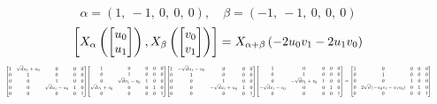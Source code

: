 \documentclass[11pt]{article}
\theoremstyle{definition}
\begin{document}
\[
\alpha = \left( 1, \  -1, \  0, \  0, \  0\right), \quad \beta = \left( -1, \  -1, \  0, \  0, \  0\right)
\]
\[
\scaletoalign{\textwidth}{\left[ X_{\alpha}\left(\left[\begin{matrix}u_{0}\\u_{1}\end{matrix}\right]\right), X_{\beta}\left(\left[\begin{matrix}v_{0}\\v_{1}\end{matrix}\right]\right) \right] = X_{\alpha + \beta}\left(- 2 u_{0} v_{1} - 2 u_{1} v_{0}\right)}
\]
\[
\scaletoalign{\textwidth}{{\left[\begin{matrix}1 & \sqrt{d} u_{1} + u_{0} & 0 & 0 & 0\\0 & 1 & 0 & 0 & 0\\0 & 0 & 1 & 0 & 0\\0 & 0 & \sqrt{d} u_{1} - u_{0} & 1 & 0\\0 & 0 & 0 & 0 & 1\end{matrix}\right]} {\left[\begin{matrix}1 & 0 & 0 & 0 & 0\\0 & 1 & 0 & 0 & 0\\0 & \sqrt{d} v_{1} - v_{0} & 1 & 0 & 0\\\sqrt{d} v_{1} + v_{0} & 0 & 0 & 1 & 0\\0 & 0 & 0 & 0 & 1\end{matrix}\right]} {\left[\begin{matrix}1 & - \sqrt{d} u_{1} - u_{0} & 0 & 0 & 0\\0 & 1 & 0 & 0 & 0\\0 & 0 & 1 & 0 & 0\\0 & 0 & - \sqrt{d} u_{1} + u_{0} & 1 & 0\\0 & 0 & 0 & 0 & 1\end{matrix}\right]} {\left[\begin{matrix}1 & 0 & 0 & 0 & 0\\0 & 1 & 0 & 0 & 0\\0 & - \sqrt{d} v_{1} + v_{0} & 1 & 0 & 0\\- \sqrt{d} v_{1} - v_{0} & 0 & 0 & 1 & 0\\0 & 0 & 0 & 0 & 1\end{matrix}\right]} = {\left[\begin{matrix}1 & 0 & 0 & 0 & 0\\0 & 1 & 0 & 0 & 0\\0 & 0 & 1 & 0 & 0\\0 & 2 \sqrt{d} \left(- u_{0} v_{1} - u_{1} v_{0}\right) & 0 & 1 & 0\\0 & 0 & 0 & 0 & 1\end{matrix}\right]}}
\]
\end{document}
